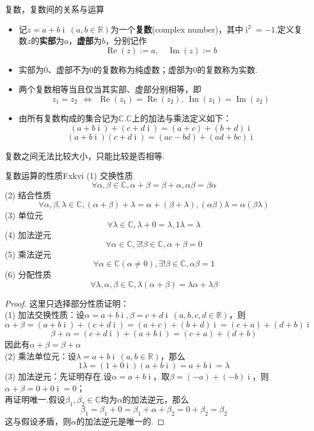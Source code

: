 \documentclass[lang=cn, zihao=5]{elegantbook}
\newcommand{\R}{\mathbb{R}}
\newcommand{\C}{\mathbb{C}}
\DeclareMathOperator{\ic}{i}
\DeclareMathOperator{\CRe}{Re}
\DeclareMathOperator{\CIm}{Im}
\begin{document}
\newpage
\begin{definition}{复数，复数间的关系与运算}
	\begin{itemize}
		\item 记$z=a+b\ic ~(a,b \in \R )$为一个\textbf{复数}(complex number)，其中$\ic ^2=-1$.定义复数$z$的\textbf{实部}为$a$，\textbf{虚部}为$b$，分别记作$$\CRe (z):=a,\quad \CIm (z):=b$$
		\item 实部为$0$、虚部不为$0$的复数称为纯虚数；虚部为$0$的复数称为实数.
		\item 两个复数相等当且仅当其实部、虚部分别相等，即$$z_1=z_2 ~~ \Leftrightarrow ~~ \CRe (z_1) = \CRe (z_2) ,~ \CIm (z_1) = \CIm (z_2)$$
		\item 由所有复数构成的集合记为$\C$.$\C$上的加法与乘法定义如下：
			$$(a+b\ic ) + (c+d\ic ) = (a+c) + (b+d)\ic $$
			$$(a+b\ic )(c+d\ic ) = (ac-bd) + (ad+bc)\ic $$
	\end{itemize}
\end{definition}
\begin{remark}
	复数之间无法比较大小，只能比较是否相等.
\end{remark}

\begin{proposition}{复数运算的性质}{Fxkvi}
	(1) 交换性质$$\forall \alpha , \beta \in \C , \alpha + \beta = \beta + \alpha , \alpha \beta = \beta \alpha$$
	(2) 结合性质$$\forall \alpha , \beta , \lambda \in \C , (\alpha + \beta) + \lambda = \alpha + (\beta + \lambda) , (\alpha \beta) \lambda = \alpha (\beta \lambda)$$
	(3) 单位元$$\forall \lambda \in \C , \lambda + 0 = \lambda , 1 \lambda = \lambda$$
	(4) 加法逆元$$\forall \alpha \in \C , \exists ! \beta \in \C , \alpha + \beta = 0$$
	(5) 乘法逆元$$\forall \alpha \in \C (\alpha \neq 0) , \exists ! \beta \in \C , \alpha \beta = 1$$
	(6) 分配性质$$\forall \lambda , \alpha , \beta \in \C , \lambda (\alpha + \beta) = \lambda \alpha + \lambda \beta$$
\end{proposition}
\begin{proof}
	这里只选择部分性质证明： \\
	(1) 加法交换性质：设$\alpha = a+b\ic , \beta = c+d\ic ~(a,b,c,d \in \R )$，则
	$$\alpha + \beta = (a+b\ic ) + (c+d\ic ) = (a+c) + (b+d)\ic = (c+a) + (d+b)\ic$$
	$$\beta + \alpha = (c+d\ic ) + (a+b\ic ) = (c+a) + (d+b)$$
	因此有$\alpha + \beta = \beta + \alpha$ \\
	(2) 乘法单位元：设$\lambda = a+b\ic ~ (a,b \in \R )$，那么$$1 \lambda = (1+0\ic )(a+b\ic ) = a + b\ic = \lambda$$
	(3) 加法逆元：先证明存在.设$\alpha = a+b\ic $，取$\beta = (-a) + (-b)\ic $，则$\alpha + \beta = 0+0\ic = 0$；\\
	再证明唯一.假设$\beta _1, \beta _2 \in \C $均为$\alpha$的加法逆元，那么$$\beta _1 = \beta _1 + 0 = \beta _1 + \alpha + \beta _2 = 0 + \beta _2 = \beta _2$$
	这与假设矛盾，则$\alpha$的加法逆元是唯一的.
\end{proof}
\end{document}
